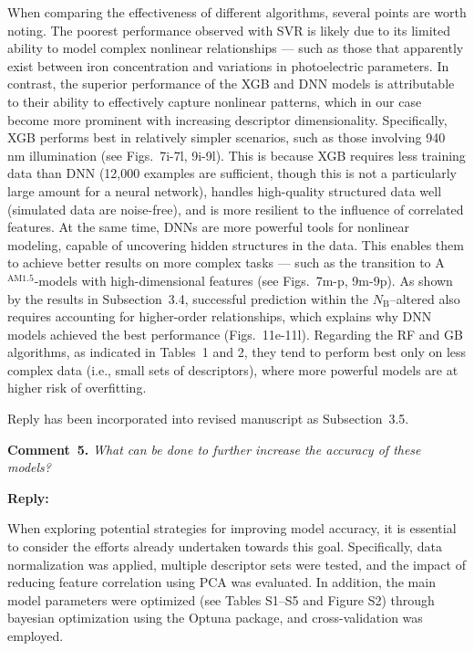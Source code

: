 \documentclass[a4paper,fleqn]{cas-sc}
\begin{document}
When comparing the effectiveness of different algorithms, several points are worth noting.
The poorest performance observed with SVR is likely due to its limited ability
to model complex nonlinear relationships ---
such as those that apparently exist between iron concentration and variations in photoelectric parameters.
In contrast, the superior performance of the XGB and DNN models is attributable to
their ability to effectively capture nonlinear patterns, which in our case become more prominent with increasing descriptor dimensionality.
Specifically, XGB performs best in relatively simpler scenarios, such as those involving 940 nm illumination
(see Figs.~7i-7l, 9i-9l).
This is because XGB requires less training data than DNN
(12,000 examples are sufficient, though this is not a particularly large amount for a neural network),
handles high-quality structured data well (simulated data are noise-free),
and is more resilient to the influence of correlated features.
At the same time, DNNs are more powerful tools for nonlinear modeling,
capable of uncovering hidden structures in the data.
This enables them to achieve better results on more complex tasks ---
such as the transition to A$^\mathrm{AM1.5}$-models with high-dimensional features
(see Figs.~7m-p, 9m-9p).
As shown by the results in Subsection~3.4, successful prediction within the
$N_\mathrm{B}$--altered also requires accounting for higher-order relationships,
which explains why DNN models achieved the best performance (Figs.~11e-11l).
Regarding the RF and GB algorithms, as indicated in Tables~1 and 2,
they tend to perform best only on less complex data
(i.e., small sets of descriptors), where more powerful models are at higher risk of overfitting.

Reply has been incorporated into revised manuscript as Subsection~3.5.

\vspace{1cm}
\noindent
\textcolor[rgb]{0.00,0.50,1.00}{\textbf{Comment~5.}}
\emph{What can be done to further increase the accuracy of these models?}

\noindent
\textcolor[rgb]{0.51,0.00,0.00}{\textbf{Reply:}}

When exploring potential strategies for improving model accuracy,
it is essential to consider the efforts already undertaken towards this goal.
Specifically, data normalization was applied,
multiple descriptor sets were tested, and the impact of reducing feature correlation using PCA was evaluated.
In addition, the main model parameters were optimized (see Tables S1–S5 and Figure S2)
through bayesian optimization using the Optuna package, and cross-validation was employed.
\end{document}

